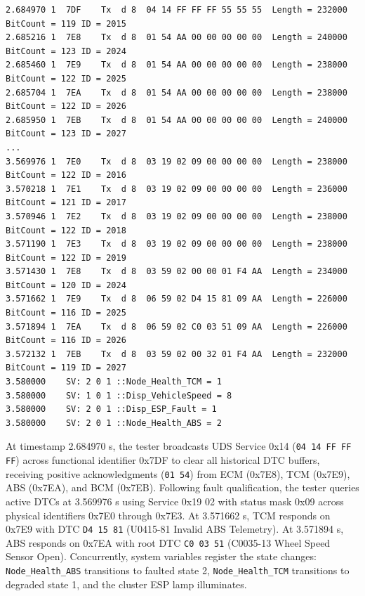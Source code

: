 \documentclass[11pt,a4paper]{article}
\begin{document}
\begin{lstlisting}[caption={Simulation Logging Trace from IVN\_Simulation\_Trace\_ALL\_CASE\_2.asc},label={lst:asc_trace}]
2.684970 1  7DF    Tx  d 8  04 14 FF FF FF 55 55 55  Length = 232000 BitCount = 119 ID = 2015
2.685216 1  7E8    Tx  d 8  01 54 AA 00 00 00 00 00  Length = 240000 BitCount = 123 ID = 2024
2.685460 1  7E9    Tx  d 8  01 54 AA 00 00 00 00 00  Length = 238000 BitCount = 122 ID = 2025
2.685704 1  7EA    Tx  d 8  01 54 AA 00 00 00 00 00  Length = 238000 BitCount = 122 ID = 2026
2.685950 1  7EB    Tx  d 8  01 54 AA 00 00 00 00 00  Length = 240000 BitCount = 123 ID = 2027
...
3.569976 1  7E0    Tx  d 8  03 19 02 09 00 00 00 00  Length = 238000 BitCount = 122 ID = 2016
3.570218 1  7E1    Tx  d 8  03 19 02 09 00 00 00 00  Length = 236000 BitCount = 121 ID = 2017
3.570946 1  7E2    Tx  d 8  03 19 02 09 00 00 00 00  Length = 238000 BitCount = 122 ID = 2018
3.571190 1  7E3    Tx  d 8  03 19 02 09 00 00 00 00  Length = 238000 BitCount = 122 ID = 2019
3.571430 1  7E8    Tx  d 8  03 59 02 00 00 01 F4 AA  Length = 234000 BitCount = 120 ID = 2024
3.571662 1  7E9    Tx  d 8  06 59 02 D4 15 81 09 AA  Length = 226000 BitCount = 116 ID = 2025
3.571894 1  7EA    Tx  d 8  06 59 02 C0 03 51 09 AA  Length = 226000 BitCount = 116 ID = 2026
3.572132 1  7EB    Tx  d 8  03 59 02 00 32 01 F4 AA  Length = 232000 BitCount = 119 ID = 2027
3.580000    SV: 2 0 1 ::Node_Health_TCM = 1
3.580000    SV: 1 0 1 ::Disp_VehicleSpeed = 8
3.580000    SV: 2 0 1 ::Disp_ESP_Fault = 1
3.580000    SV: 2 0 1 ::Node_Health_ABS = 2
\end{lstlisting}

At timestamp 2.684970 s, the tester broadcasts UDS Service 0x14 (\texttt{04 14 FF FF FF}) across functional identifier 0x7DF to clear all historical DTC buffers, receiving positive acknowledgments (\texttt{01 54}) from ECM (0x7E8), TCM (0x7E9), ABS (0x7EA), and BCM (0x7EB). Following fault qualification, the tester queries active DTCs at 3.569976 s using Service 0x19 02 with status mask 0x09 across physical identifiers 0x7E0 through 0x7E3. At 3.571662 s, TCM responds on 0x7E9 with DTC \texttt{D4 15 81} (U0415-81 Invalid ABS Telemetry). At 3.571894 s, ABS responds on 0x7EA with root DTC \texttt{C0 03 51} (C0035-13 Wheel Speed Sensor Open). Concurrently, system variables register the state changes: \texttt{Node\_Health\_ABS} transitions to faulted state 2, \texttt{Node\_Health\_TCM} transitions to degraded state 1, and the cluster ESP lamp illuminates.

\end{document}
